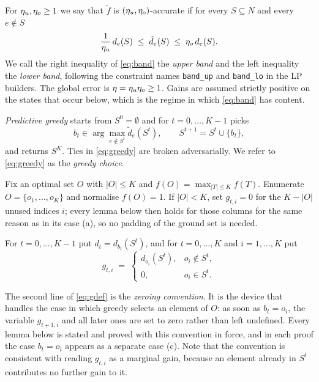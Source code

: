 \begin{definition}
\label{def:band}
For $\eta_{u}, \eta_{o} \ge 1$ we say that $\tilde f$ is $(\eta_{u}, \eta_{o})$-accurate if
for every $S \subseteq N$ and every $e \notin S$
\begin{equation}
\label{eq:band}
\frac{1}{\eta_{u}}\, d_{e}(S) \;\le\; \tilde d_{e}(S) \;\le\; \eta_{o}\, d_{e}(S) .
\end{equation}
We call the right inequality of \eqref{eq:band} the \emph{upper band} and the
left inequality the \emph{lower band}, following the constraint names
\texttt{band\_up} and \texttt{band\_lo} in the LP builders. The global error is
$\eta = \eta_{u} \eta_{o} \ge 1$. Gains are assumed strictly positive on the states
that occur below, which is the regime in which \eqref{eq:band} has content.
\end{definition}

\emph{Predictive greedy} starts from $S^{0} = \emptyset$ and for
$t = 0, \dots, K-1$ picks
\begin{equation}
\label{eq:greedy}
b_{t} \in \arg\max_{e \notin S^{t}} \tilde d_{e}(S^{t}),
\qquad S^{t+1} = S^{t} \cup \{b_{t}\},
\end{equation}
and returns $S^{K}$. Ties in \eqref{eq:greedy} are broken adversarially. We
refer to \eqref{eq:greedy} as the \emph{greedy choice}.

Fix an optimal set $O$ with $|O| \le K$ and $f(O) = \max_{|T| \le K} f(T)$.
Enumerate $O = \{o_{1}, \dots, o_{K}\}$ and normalise $f(O) = 1$. If $|O| < K$,
set $g_{t,i} = 0$ for the $K - |O|$ unused indices $i$; every lemma below then
holds for those columns for the same reason as in its case (a), so no padding of
the ground set is needed.

\begin{definition}
\label{def:vars}
For $t = 0, \dots, K-1$ put $d_{t} = d_{b_{t}}(S^{t})$, and for
$t = 0, \dots, K$ and $i = 1, \dots, K$ put
\begin{equation}
\label{eq:gdef}
g_{t,i} \;=\;
\begin{cases}
d_{o_{i}}(S^{t}), & o_{i} \notin S^{t},\\[2pt]
0, & o_{i} \in S^{t}.
\end{cases}
\end{equation}
\end{definition}

The second line of \eqref{eq:gdef} is the \emph{zeroing convention}. It is the
device that handles the case in which greedy selects an element of $O$: as soon
as $b_{t} = o_{i}$, the variable $g_{t+1,i}$ and all later ones are set to zero
rather than left undefined. Every lemma below is stated and proved with this
convention in force, and in each proof the case $b_{t} = o_{i}$ appears as a
separate case (c). Note that the convention is consistent with reading
$g_{t,i}$ as a marginal gain, because an element already in $S^{t}$ contributes
no further gain to it.

